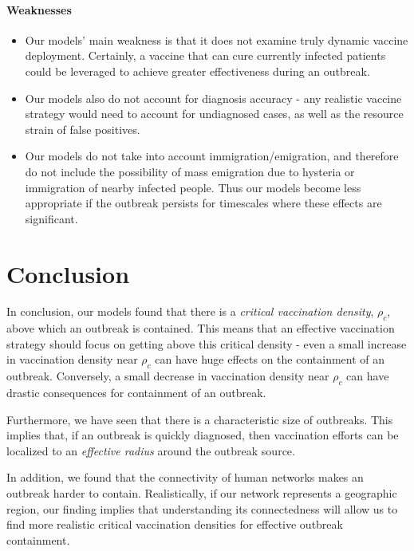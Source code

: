 \documentclass{article}
\begin{document}
\paragraph{Weaknesses}
\begin{itemize}
\item Our models' main weakness is that it does not examine truly dynamic vaccine deployment. Certainly, a vaccine that can cure currently infected patients could be leveraged to achieve greater effectiveness during an outbreak.
\item Our models also do not account for diagnosis accuracy - any realistic vaccine strategy would need to account for undiagnosed cases, as well as the resource strain of false positives.
\item Our models do not take into account immigration/emigration, and therefore do not include the possibility of mass emigration due to hysteria or immigration of nearby infected people. Thus our models become less appropriate if the outbreak persists for timescales where these effects are significant.
\end{itemize}

\section{Conclusion}

In conclusion, our models found that there is a \textit{critical vaccination density}, $\rho_c$, above which an outbreak is contained. This means that an effective vaccination strategy should focus on getting above this critical density - even a small increase in vaccination density near $\rho_c$ can have huge effects on the containment of an outbreak. Conversely, a small decrease in vaccination density near $\rho_c$ can have drastic consequences for containment of an outbreak.

Furthermore, we have seen that there is a characteristic size of outbreaks. This implies that, if an outbreak is quickly diagnosed, then vaccination efforts can be localized to an \textit{effective radius} around the outbreak source.

In addition, we found that the connectivity of human networks makes an outbreak harder to contain. Realistically, if our network represents a geographic region, our finding implies that understanding its connectedness will allow us to find more realistic critical vaccination densities for effective outbreak containment.

\clearpage
\end{document}

